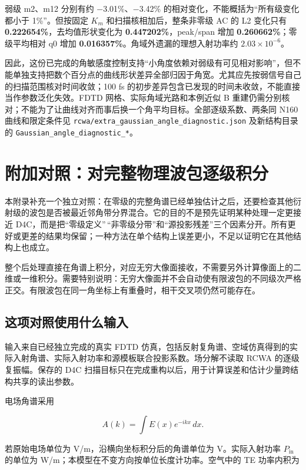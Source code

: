 \documentclass[
  chinese,
  UTF8,
  a4paper,
  11pt]{ctexart}
\begin{document}
弱级 m2、m12 分别有约 −3.01\%、−3.42\%
的相对变化，不能概括为``所有级变化都小于 1\%''。但按固定 \(K_m\)
和扫描核相加后，整条非零级 AC 的 L2 变化只有
\textbf{0.222654\%}，去均值形状变化为 \textbf{0.447202\%}，peak/span
增加 \textbf{0.260662\%}；零级平均相对 q0 增加
\textbf{0.016357\%}。角域外遗漏的理想入射功率约 \(2.03\times10^{-6}\)。

因此，这份已完成的角敏感度控制支持``小角度依赖对弱级有可见相对影响''，但不能单独支持把数个百分点的曲线形状差异全部归因于角宽。尤其应先按弱信号自己的扫描范围核对时间收敛；100
fs 的初步差异包含已发现的时间未收敛，不能直接当作参数泛化失效。FDTD
网格、实际角域光路和本例近似 B
重建仍需分别核对；不能为了让曲线对齐而事后换一个角平均目标。全部逐级系数、两条同
N160 曲线和限定条件见
\texttt{rcwa/extra\_gaussian\_angle\_diagnostic.json} 及新结构目录的
\texttt{Gaussian\_angle\_diagnostic\_*}。

\section{附加对照：对完整物理波包逐级积分}\label{ux9644ux52a0ux5bf9ux7167ux5bf9ux5b8cux6574ux7269ux7406ux6ce2ux5305ux9010ux7ea7ux79efux5206}

本附录补充一个独立对照：在零级的完整角谱已经单独估计之后，还要检查其他衍射级的波包是否被最近邻角带分界混合。它的目的不是预先证明某种处理一定更接近
D4C，而是把``零级定义''\,``非零级分带''和``源投影残差''三个因素分开。所有更好或更差的结果均保留；一种方法在单个结构上误差更小，不足以证明它在其他结构上也成立。

整个后处理直接在角谱上积分，对应无穷大像面接收，不需要另外计算像面上的二维或一维积分。需要特别说明：无穷大像面并不会自动使有限波包的不同级次严格正交。有限波包在同一角坐标上有重叠时，相干交叉项仍然可能存在。

\subsection{这项对照使用什么输入}\label{ux8fd9ux9879ux5bf9ux7167ux4f7fux7528ux4ec0ux4e48ux8f93ux5165}

输入来自已经独立完成的真实 FDTD
仿真，包括反射复角谱、空域仿真得到的实际入射角谱、实际入射功率和源模板联合投影系数。场分解不读取
RCWA 的逐级复振幅。保存的 D4C
扫描目标只在完成重构以后，用于计算误差和估计少量跨结构共享的读出参数。

电场角谱采用

\[
A(k)=\int E(x)e^{-ikx}\,dx.
\]

若原始电场单位为 V/m，沿横向坐标积分后的角谱单位为 V。实际入射功率
\(P_{\mathrm{in}}\) 的单位为
W/m；本模型在不变方向按单位长度计功率。空气中的 TE 功率内积为
\end{document}
